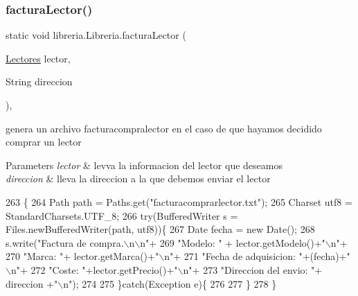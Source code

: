 \subsubsection{\texorpdfstring{factura\+Lector()}{facturaLector()}}
{\footnotesize\ttfamily static void libreria.\+Libreria.\+factura\+Lector (\begin{DoxyParamCaption}\item[{\mbox{\hyperlink{classlibreria_1_1_lectores}{Lectores}}}]{lector,  }\item[{String}]{direccion }\end{DoxyParamCaption})\hspace{0.3cm}{\ttfamily [inline]}, {\ttfamily [static]}}

genera un archivo facturacompralector en el caso de que hayamos decidido comprar un lector 
\begin{DoxyParams}{Parameters}
{\em lector} & levva la informacion del lector que deseamos \\
\hline
{\em direccion} & lleva la direccion a la que debemos enviar el lector \\
\hline
\end{DoxyParams}

\begin{DoxyCode}
263                                                                          \{
264          Path path = Paths.get(\textcolor{stringliteral}{"facturacomprarlector.txt"});
265          Charset utf8 = StandardCharsets.UTF\_8;
266          \textcolor{keywordflow}{try}(BufferedWriter s = Files.newBufferedWriter(path, utf8))\{
267              Date fecha = \textcolor{keyword}{new} Date();
268              s.write(\textcolor{stringliteral}{"Factura de compra.\(\backslash\)n\(\backslash\)n"}+
269                      \textcolor{stringliteral}{"Modelo: "} + lector.getModelo()+\textcolor{stringliteral}{"\(\backslash\)n"}+
270                      \textcolor{stringliteral}{"Marca: "}+ lector.getMarca()+\textcolor{stringliteral}{"\(\backslash\)n"}+
271                      \textcolor{stringliteral}{"Fecha de adquisicion: "}+(fecha)+\textcolor{stringliteral}{"\(\backslash\)n"}+
272                      \textcolor{stringliteral}{"Coste: "}+lector.getPrecio()+\textcolor{stringliteral}{"\(\backslash\)n"}+
273                      \textcolor{stringliteral}{"Direccion del envio: "}+ direccion +\textcolor{stringliteral}{"\(\backslash\)n"});
274              
275          \}\textcolor{keywordflow}{catch}(Exception e)\{
276              
277          \}
278      \}
\end{DoxyCode}
\mbox{\label{classlibreria_1_1_libreria_ac64f9e699ce3d10290c3f3303611b04a}} 
